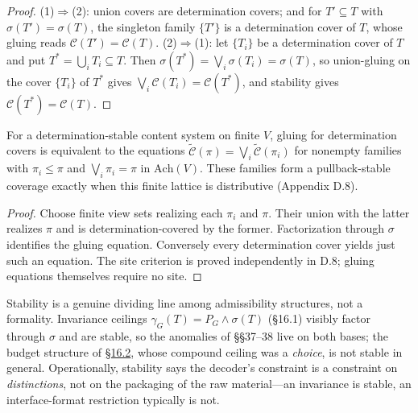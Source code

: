 \begin{proof}

(1)\(\Rightarrow\)(2): union covers are determination covers; and for \(T' \subseteq T\) with \(\sigma(T') = \sigma(T)\), the singleton family \(\{T'\}\) is a determination cover of \(T\), whose gluing reads \(\mathcal{C}(T') = \mathcal{C}(T)\). (2)\(\Rightarrow\)(1): let \(\{T_i\}\) be a determination cover of \(T\) and put \(T^* = \bigcup_i T_i \subseteq T\). Then \(\sigma(T^*) = \bigvee_i \sigma(T_i) = \sigma(T)\), so union-gluing on the cover \(\{T_i\}\) of \(T^*\) gives \(\bigvee_i \mathcal{C}(T_i) = \mathcal{C}(T^*)\), and stability gives \(\mathcal{C}(T^*) = \mathcal{C}(T)\).
\end{proof}

\begin{thmplain}

For a determination-stable content system on finite \(V\), gluing for determination covers is equivalent to the equations \(\widetilde{\mathcal C}(\pi)=\bigvee_i\widetilde{\mathcal C}(\pi_i)\) for nonempty families with \(\pi_i\le\pi\) and \(\bigvee_i\pi_i=\pi\) in \(\mathrm{Ach}(V)\). These families form a pullback-stable coverage exactly when this finite lattice is distributive (Appendix D.8).
\end{thmplain}

\begin{proof}

Choose finite view sets realizing each \(\pi_i\) and \(\pi\). Their union with the latter realizes \(\pi\) and is determination-covered by the former. Factorization through \(\sigma\) identifies the gluing equation. Conversely every determination cover yields just such an equation. The site criterion is proved independently in D.8; gluing equations themselves require no site.
\end{proof}

Stability is a genuine dividing line among admissibility structures, not a formality. Invariance ceilings \(\gamma_G(T) = P_G \wedge \sigma(T)\) (§16.1) visibly factor through \(\sigma\) and are stable, so the anomalies of §§37--38 live on both bases; the budget structure of \hyperlink{sec:16.2}{§16.2}, whose compound ceiling was a \emph{choice}, is not stable in general. Operationally, stability says the decoder's constraint is a constraint on \emph{distinctions}, not on the packaging of the raw material---\hspace{0pt}an invariance is stable, an interface-format restriction typically is not.


